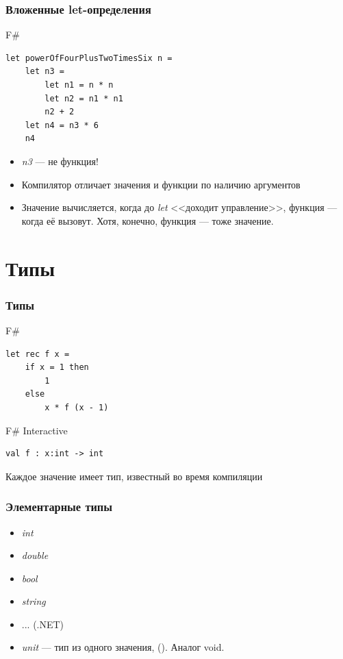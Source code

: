 \documentclass[xetex,mathserif,serif]{beamer}
\begin{document}
	\begin{frame}[fragile]
		\frametitle{Вложенные let-определения}
		\begin{exampleblock}{F\#}
			\begin{verbatim}
let powerOfFourPlusTwoTimesSix n =
    let n3 =
        let n1 = n * n
        let n2 = n1 * n1
        n2 + 2
    let n4 = n3 * 6
    n4
			\end{verbatim}
		\end{exampleblock}
		\begin{itemize}
			\item \textit{n3} --- не функция!
			\item Компилятор отличает значения и функции по наличию аргументов
			\item Значение вычисляется, когда до \textit{let} <<доходит управление>>, 
					функция --- когда её вызовут. Хотя, конечно, функция --- тоже значение.
		\end{itemize}
\end{frame}
			
	\section{Типы}
			
	\begin{frame}[fragile]
		\frametitle{Типы}
		\begin{exampleblock}{F\#}
			\begin{verbatim}
let rec f x =
    if x = 1 then 
        1 
    else 
        x * f (x - 1)
			\end{verbatim}
		\end{exampleblock}

		\begin{alertblock}{F\# Interactive}
			\begin{verbatim}
val f : x:int -> int
			\end{verbatim}
		\end{alertblock}
		Каждое значение имеет тип, известный во время компиляции
\end{frame}
			
	\begin{frame}
		\frametitle{Элементарные типы}
		\begin{itemize}
			\item \textit{int}
			\item \textit{double}
			\item \textit{bool}
			\item \textit{string}
			\item ... (.NET)
			\item \textit{unit} --- тип из одного значения, (). Аналог void.
		\end{itemize}
	\end{frame}
	
\end{document}
